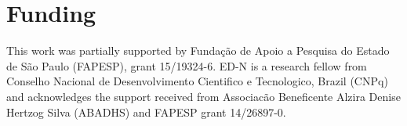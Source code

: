 \documentclass{bioinfo}
\begin{document}
\section*{Funding}
This work was partially supported by Funda\c{c}\~ao de Apoio a
Pesquisa do Estado de S\~ao Paulo (FAPESP), grant 15/19324-6. ED-N is
a research fellow from Conselho Nacional de Desenvolvimento Cientifico
e Tecnologico, Brazil (CNPq) and acknowledges the support received
from Associac\~ao Beneficente Alzira Denise Hertzog Silva (ABADHS) and
FAPESP grant 14/26897-0.



\end{document}
